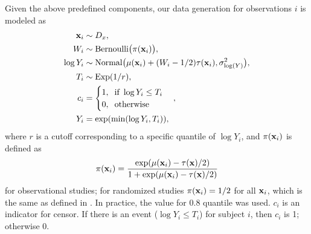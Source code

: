     Given the above predefined components, our data generation for observations $i$ is modeled as
    \begin{equation*}
      \begin{split}
        \mathbf{x}_i & \sim D_x, \\
        W_i & \sim \mathrm{Bernoulli}\big( \pi(\mathbf{x}_i) \big), \\
        \log Y_i & \sim \mathrm{Normal} \big( \mu(\mathbf{x}_i) + (W_i - 1/2) \tau(\mathbf{x}_i), \sigma_{\log(Y)}^2  \big), \\
        T_i & \sim \mathrm{Exp}(1/r),\\
        c_i & = \begin{cases} 1, \hspace{0.2cm} \text{if } \log Y_i \leq T_i \\ 0, \hspace{0.2cm} \text{otherwise } \end{cases}, \\
        Y_i & = \exp( \min(\log Y_i, T_i) ),
      \end{split}
    \end{equation*}
    where $r$ is a cutoff corresponding to a specific quantile of $\log Y_i$, and $\pi(\mathbf{x}_i)$ is defined as
    \begin{equation}
      \label{eqn:ite_pi}
      \pi(\mathbf{x}_i) = \frac{\exp(\mu(\mathbf{x}_i) - \tau(\mathbf{x})/2)}{1 + \exp(\mu(\mathbf{x}_i) - \tau(\mathbf{x})/2)} 
    \end{equation}
    for observational studies; for randomized studies $\pi(\mathbf{x}_i) = 1/2$ for all $\mathbf{x}_i$, which is the same as defined in \cite{powers2017some}. In practice, the value for 0.8 quantile  was used. $c_i$ is an indicator for censor. If there is an event ($\log Y_i \leq T_i$) for subject $i$, then $c_i$ is 1; otherwise 0.
    
